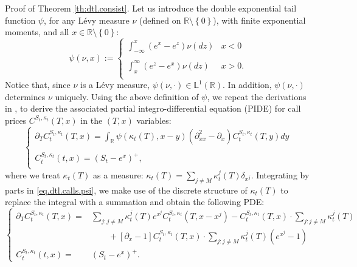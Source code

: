 \documentclass{article}
\numberwithin{equation}{section}
\newcommand\RR {\mathbb R}
\begin{document}
Proof of Theorem \ref{th:dtl.consist}.
Let us introduce the double exponential tail function $\psi$, for any L\'evy measure $\nu$ (defined on $\RR\setminus\left\{ 0\right\}$), with finite exponential moments, and all $x\in\RR\setminus\left\{ 0\right\}$:
\begin{equation}\label{eq.dtl.psi.gen}
\psi(\nu,x) := \left\{
\begin{array}{cc}
{\int_{-\infty}^{x} (e^x-e^z) \nu(dz)} & {x<0}\\
{} & {}\\
{\int_{x}^{\infty} (e^z-e^x) \nu(dz)} & {x>0.}\\
\end{array}
\right.
\end{equation}
Notice that, since $\nu$ is a L\'evy measure, $\psi(\nu,\cdot)\in\mathbb{L}^1(\RR)$. In addition, $\psi(\nu,\cdot)$ determines $\nu$ uniquely.
Using the above definition of $\psi$, we repeat the derivations in \cite{Carr2004locallevy}, to derive the associated partial integro-differential equation (PIDE) for call prices $C^{S_t,\kappa_t}(T,x)$ in the $(T,x)$ variables: 
\begin{equation}\label{eq.dtl.calls.psi}
\left\{
\begin{array}{c}
{\partial_{T} C^{S_t,\kappa_t}_t(T,x)=\int_{\RR} \psi(\kappa_t(T),x-y) \left(\partial^2_{xx} - \partial_x\right) C^{S_t,\kappa_t}_t(T,y) dy}\\
{}\\
{C^{S_t,\kappa_t}_t(t,x) = (S_t-e^x)^+,}\\
\end{array}
\right.
\end{equation}
where we treat $\kappa_t(T)$ as a measure: $\kappa_t(T) = \sum_{j\neq M} \kappa^j_t(T) \delta_{x^j}$.
Integrating by parts in \eqref{eq.dtl.calls.psi}, we make use of the discrete structure of $\kappa_t(T)$ to replace the integral with a summation and obtain the following PDE:
\begin{equation}\label{fo:dtL:callPIDE}
\left\{
\begin{array}{rl}
\partial_{T} C_t^{S_t,\kappa_t}(T,x)= & \underset{j:j\neq M}\sum \kappa_t^j(T) e^{x^j} C_t^{S_t, \kappa_t}(T,x-x^j) - C_t^{S_t,\kappa_t}(T,x) \cdot \underset{j:j\neq M}\sum \kappa_t^j(T) \\
& \qquad + [\partial_x -1]C_t^{S_t,\kappa_t}(T,x) \cdot \underset{j:j\neq M} \sum \kappa_t^j(T)(e^{x^j}-1) \\
C_t^{S_t,\kappa_t}(t,x) = & (S_t-e^x)^+.
\end{array}
\right.
\end{equation}
\end{document}
